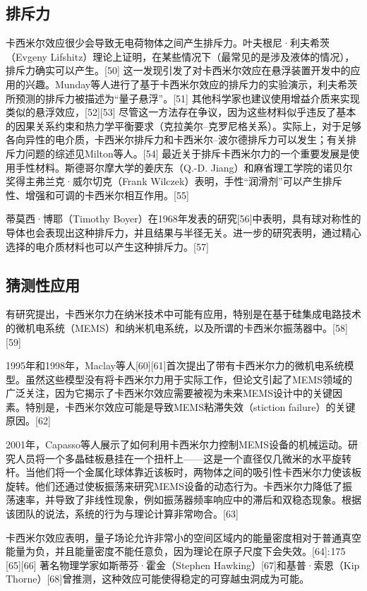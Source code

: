 \subsection{排斥力}
卡西米尔效应很少会导致无电荷物体之间产生排斥力。叶夫根尼·利夫希茨（Evgeny Lifshitz）理论上证明，在某些情况下（最常见的是涉及液体的情况），排斥力确实可以产生。[50] 这一发现引发了对卡西米尔效应在悬浮装置开发中的应用的兴趣。Munday等人进行了基于卡西米尔效应的排斥力的实验演示，利夫希茨所预测的排斥力被描述为“量子悬浮”。[51] 其他科学家也建议使用增益介质来实现类似的悬浮效应，[52][53] 尽管这一方法存在争议，因为这些材料似乎违反了基本的因果关系约束和热力学平衡要求（克拉美尔–克罗尼格关系）。实际上，对于足够各向异性的电介质，卡西米尔排斥力和卡西米尔–波尔德排斥力可以发生；有关排斥力问题的综述见Milton等人。[54] 最近关于排斥卡西米尔力的一个重要发展是使用手性材料。斯德哥尔摩大学的姜庆东（Q.-D. Jiang）和麻省理工学院的诺贝尔奖得主弗兰克·威尔切克（Frank Wilczek）表明，手性“润滑剂”可以产生排斥性、增强和可调的卡西米尔相互作用。[55]

蒂莫西·博耶（Timothy Boyer）在1968年发表的研究[56]中表明，具有球对称性的导体也会表现出这种排斥力，并且结果与半径无关。进一步的研究表明，通过精心选择的电介质材料也可以产生这种排斥力。[57]
\subsection{猜测性应用}
有研究提出，卡西米尔力在纳米技术中可能有应用，特别是在基于硅集成电路技术的微机电系统（MEMS）和纳米机电系统，以及所谓的卡西米尔振荡器中。[58][59]

1995年和1998年，Maclay等人[60][61]首次提出了带有卡西米尔力的微机电系统模型。虽然这些模型没有将卡西米尔力用于实际工作，但论文引起了MEMS领域的广泛关注，因为它揭示了卡西米尔效应需要被视为未来MEMS设计中的关键因素。特别是，卡西米尔效应可能是导致MEMS粘滞失效（stiction failure）的关键原因。[62]

2001年，Capasso等人展示了如何利用卡西米尔力控制MEMS设备的机械运动。研究人员将一个多晶硅板悬挂在一个扭杆上——这是一个直径仅几微米的水平旋转杆。当他们将一个金属化球体靠近该板时，两物体之间的吸引性卡西米尔力使该板旋转。他们还通过使板振荡来研究MEMS设备的动态行为。卡西米尔力降低了振荡速率，并导致了非线性现象，例如振荡器频率响应中的滞后和双稳态现象。根据该团队的说法，系统的行为与理论计算非常吻合。[63]

卡西米尔效应表明，量子场论允许非常小的空间区域内的能量密度相对于普通真空能量为负，并且能量密度不能任意负，因为理论在原子尺度下会失效。[64]: 175 [65][66] 著名物理学家如斯蒂芬·霍金（Stephen Hawking）[67]和基普·索恩（Kip Thorne）[68]曾推测，这种效应可能使得稳定的可穿越虫洞成为可能。
